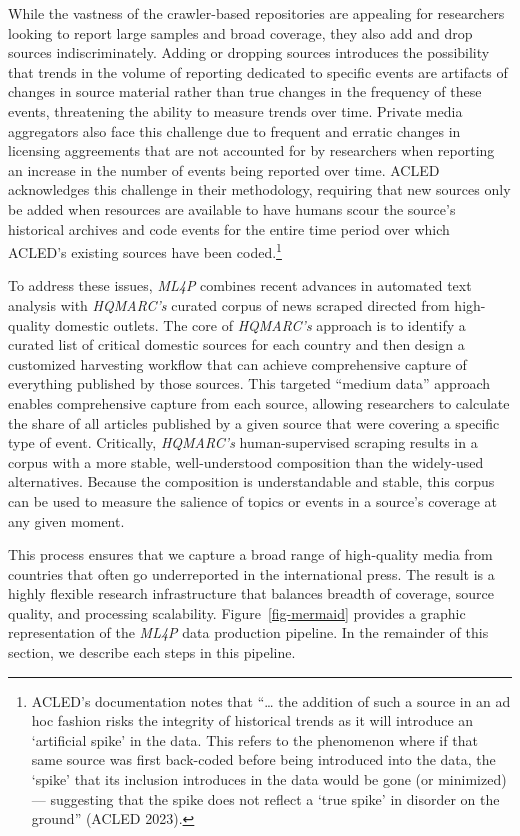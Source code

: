 \documentclass[
  letterpaper,
  DIV=11,
  numbers=noendperiod]{scrartcl}
\begin{document}
While the vastness of the crawler-based repositories are appealing for
researchers looking to report large samples and broad coverage, they
also add and drop sources indiscriminately. Adding or dropping sources
introduces the possibility that trends in the volume of reporting
dedicated to specific events are artifacts of changes in source material
rather than true changes in the frequency of these events, threatening
the ability to measure trends over time. Private media aggregators also
face this challenge due to frequent and erratic changes in licensing
aggreements that are not accounted for by researchers when reporting an
increase in the number of events being reported over time. ACLED
acknowledges this challenge in their methodology, requiring that new
sources only be added when resources are available to have humans scour
the source's historical archives and code events for the entire time
period over which ACLED's existing sources have been coded.\footnote{ACLED's
  documentation notes that ``\ldots{} the addition of such a source in
  an ad hoc fashion risks the integrity of historical trends as it will
  introduce an `artificial spike' in the data. This refers to the
  phenomenon where if that same source was first back-coded before being
  introduced into the data, the `spike' that its inclusion introduces in
  the data would be gone (or minimized) --- suggesting that the spike
  does not reflect a `true spike' in disorder on the ground'' (ACLED
  2023).}

To address these issues, \emph{ML4P} combines recent advances in
automated text analysis with \emph{HQMARC's} curated corpus of news
scraped directed from high-quality domestic outlets. The core of
\emph{HQMARC's} approach is to identify a curated list of critical
domestic sources for each country and then design a customized
harvesting workflow that can achieve comprehensive capture of everything
published by those sources. This targeted ``medium data'' approach
enables comprehensive capture from each source, allowing researchers to
calculate the share of all articles published by a given source that
were covering a specific type of event. Critically, \emph{HQMARC's}
human-supervised scraping results in a corpus with a more stable,
well-understood composition than the widely-used alternatives. Because
the composition is understandable and stable, this corpus can be used to
measure the salience of topics or events in a source's coverage at any
given moment.

This process ensures that we capture a broad range of high-quality media
from countries that often go underreported in the international press.
The result is a highly flexible research infrastructure that balances
breadth of coverage, source quality, and processing scalability.
Figure~\ref{fig-mermaid} provides a graphic representation of the
\emph{ML4P} data production pipeline. In the remainder of this section,
we describe each steps in this pipeline.
\end{document}
